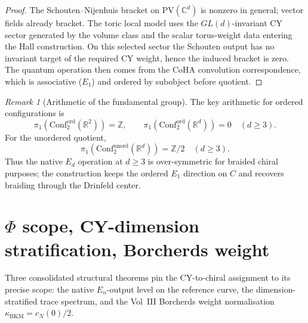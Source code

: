 \documentclass[11pt]{article}
\theoremstyle{plain}
\theoremstyle{definition}
\theoremstyle{remark}
\newtheorem{remark}[theorem]{Remark}
\newcommand{\bC}{\mathbb{C}}
\newcommand{\bR}{\mathbb{R}}
\newcommand{\bZ}{\mathbb{Z}}
\newcommand{\Eone}{E_1}
\newcommand{\En}{E_n}
\newcommand{\Conf}{\mathrm{Conf}}
\begin{document}
\begin{proof}
The Schouten--Nijenhuis bracket on $\mathrm{PV}(\bC^d)$ is nonzero in
general; vector fields already bracket.  The toric local model uses
the $GL(d)$-invariant CY sector generated by the volume class and the
scalar torus-weight data entering the Hall construction.  On this
selected sector the Schouten output has no invariant target of the
required CY weight, hence the induced bracket is zero.  The quantum
operation then comes from the CoHA convolution correspondence, which
is associative ($\Eone$) and ordered by subobject before quotient.
\end{proof}

\begin{remark}[Arithmetic of the fundamental group]
\label{rem:v3-st-pi1-arithmetic}
The key arithmetic for ordered configurations is
\[
\pi_1(\Conf^{\mathrm{ord}}_2(\bR^2))=\bZ,\qquad
\pi_1(\Conf^{\mathrm{ord}}_2(\bR^d))=0\quad(d\geq3).
\]
For the unordered quotient,
\[
\pi_1(\Conf^{\mathrm{unord}}_2(\bR^d))=\bZ/2\quad(d\geq3).
\]
Thus the native $E_d$ operation at $d\geq3$ is over-symmetric for
braided chiral purposes; the construction keeps the ordered $\Eone$
direction on $C$ and recovers braiding through the Drinfeld center.
\end{remark}



\section{$\Phi$ scope, CY-dimension stratification, Borcherds weight}
\label{sec:phi-scope-stratification-trace}

Three consolidated structural theorems pin the CY-to-chiral
assignment to its precise scope: the native $\En$-output level on the
reference curve, the dimension-stratified trace spectrum, and the
Vol~III Borcherds weight normalisation
$\kappa_{\mathrm{BKM}} = c_N(0)/2$.
\end{document}
